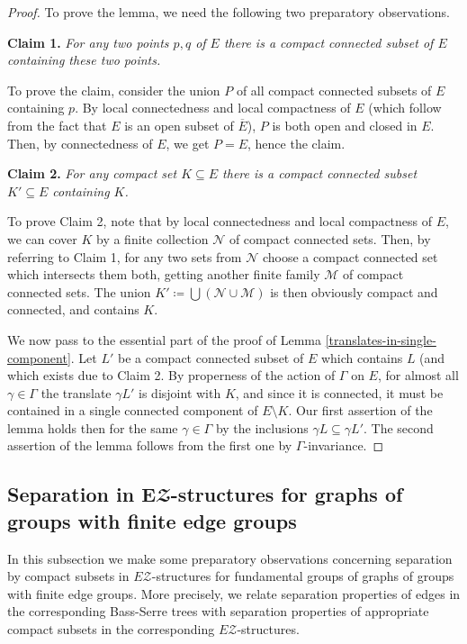 \documentclass[12pt, a4paper]{article}
\newcommand{\8}{\infty}
\theoremstyle{break}
\theoremstyle{defbreak}
\newcommand{\ol}[1]{\overline{#1}}
\begin{document}
\begin{proof}
To prove the lemma, we need the following two preparatory observations.

{\bf Claim 1.}
{\it For any two points $p,q$ of $E$ there is a compact connected subset of $E$
containing these two points.}

To prove the claim, 
consider the union $P$ of all compact connected subsets of $E$ 
containing $p$.
By local connectedness and local compactness of $E$
(which follow from the fact that $E$ is an open subset of $\ol E$), 
$P$ is both open
and closed in $E$. Then, by connectedness of $E$, we get $P=E$,
hence the claim. 

{\bf Claim 2.}
{\it For any compact set $K\subseteq E$ there is a compact connected
subset $K'\subseteq E$ containing $K$.}

To prove Claim 2, note that
by local connectedness and local compactness of $E$, we can cover $K$
by a finite collection $\mathcal{N}$ of compact connected sets. Then,
by referring to Claim 1, for any two sets from
$\mathcal{N}$ choose a compact connected set which intersects them
both, getting another finite family $\mathcal{M}$ of compact connected sets.
The union $K'\coloneqq\bigcup(\mathcal{N}\cup\mathcal{M})$ is then obviously
compact and connected, and contains $K$.

We now pass to the essential part of the proof of Lemma 
\ref{translates-in-single-component}.
Let $L'$ be a compact connected subset of $E$ which contains $L$
(and which exists due to Claim 2.
By properness of the action of $\Gamma$ on $E$,
for almost all $\gamma\in\Gamma$ the translate $\gamma L'$ is disjoint
with $K$, and since it is connected, it must be contained in a single
connected component of $E\setminus K$. Our first assertion of the lemma 
holds then
for the same $\gamma\in\Gamma$ 
by the inclusions $\gamma L\subseteq \gamma L'$.
The second assertion of the lemma follows from the first one by 
$\Gamma$-invariance.
\end{proof}




\subsection{Separation in \texorpdfstring{$\mathbf{E}\mathbfcal{Z}$}{EZ}-structures for graphs of groups with finite edge groups} \label{Subsection:separation_in_EZ_for_graphs_of_groups}

In this subsection we make some preparatory observations concerning
separation by compact subsets in $E\mathcal{Z}$-structures for
fundamental groups of graphs of groups with finite edge groups.
More precisely, we relate separation properties of edges in the corresponding
Bass-Serre trees with separation properties of appropriate compact subsets
in the corresponding $E\mathcal{Z}$-structures.
\end{document}
